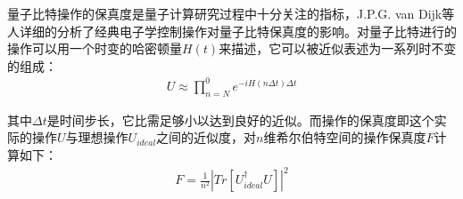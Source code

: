 量子比特操作的保真度是量子计算研究过程中十分关注的指标，J.P.G. van Dijk等人\cite[]{van_Dijk_Kawakami_Schouten_Veldhorst_Vandersypen_Babaie_Charbon_Sebastiano_2019}详细的分析了经典电子学控制操作对量子比特保真度的影响。对量子比特进行的操作可以用一个时变的哈密顿量$H(t)$来描述，它可以被近似表述为一系列时不变的组成：
\begin{align}
    U\approx \prod_{n=N}^{0} e^{-iH(n\Delta t)\Delta t}
\end{align}

其中$\Delta t$是时间步长，它比需足够小以达到良好的近似。而操作的保真度即这个实际的操作$U$与理想操作$U_{ideal}$之间的近似度，对$n$维希尔伯特空间的操作保真度$F$计算如下：
\begin{align}
    F=\frac{1}{n^2}\left|Tr\left[U_{ideal}^{\dagger}U\right]\right|^2
\end{align}





